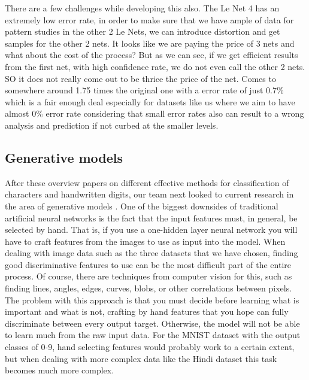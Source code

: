 \documentclass[12pt]{article}  %
\begin{document}
There are a few challenges while developing this also. The Le Net 4 has an extremely low error rate, in order to make sure that we have ample of data for pattern studies in the other 2 Le Nets, we can introduce distortion and get samples for the other 2 nets.
It looks like we are paying the price of 3 nets and what about the cost of the process? But as we can see, if we get efficient results from the first net, with high confidence rate, we do not even call the other 2 nets. SO it does not really come out to be thrice the price of the net. Comes to somewhere around 1.75 times the original one with a error rate of just 0.7\% which is a fair enough deal especially for datasets like us where we aim to have almost 0\% error rate considering that small error rates also can result to a wrong analysis and prediction if not curbed at the smaller levels.


\subsection{Generative models}
\label{Generative models}

After these overview papers on different effective methods for classification of characters and handwritten digits, our team next looked to current research in the area of generative models \cite{citeulike:9939642}.  One of the biggest downsides of traditional artificial neural networks is the fact that the input features must, in general, be selected by hand.  That is, if you use a one-hidden layer neural network you will have to craft features from the images to use as input into the model.  When dealing with image data such as the three datasets that we have chosen, finding good discriminative features to use can be the most difficult part of the entire process.  Of course, there are techniques from computer vision for this, such as finding lines, angles, edges, curves, blobs, or other correlations between pixels.  The problem with this approach is that you must decide before learning what is important and what is not, crafting by hand features that you hope can fully discriminate between every output target.  Otherwise, the model will not be able to learn much from the raw input data.  For the MNIST dataset with the output classes of 0-9, hand selecting features would probably work to a certain extent, but when dealing with more complex data like the Hindi dataset this task becomes much more complex.
\end{document}

